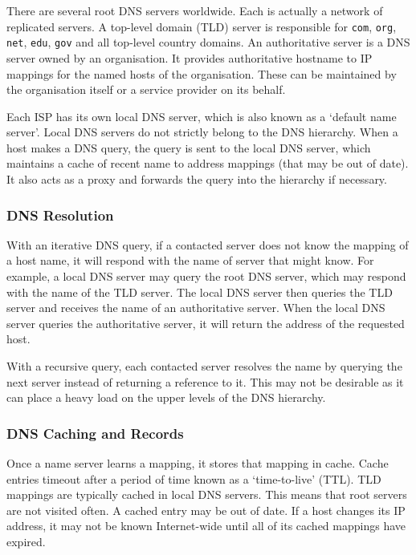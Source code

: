 There are several root DNS servers worldwide.
Each is actually a network of replicated servers.
A top-level domain (TLD) server is responsible for \texttt{com}, \texttt{org}, \texttt{net}, \texttt{edu}, \texttt{gov} and all top-level country domains.
An authoritative server is a DNS server owned by an organisation.
It provides authoritative hostname to IP mappings for the named hosts of the organisation.
These can be maintained by the organisation itself or a service provider on its behalf.

Each ISP has its own local DNS server, which is also known as a `default name server'.
Local DNS servers do not strictly belong to the DNS hierarchy.
When a host makes a DNS query, the query is sent to the local DNS server, which maintains a cache of recent name to address mappings (that may be out of date).
It also acts as a proxy and forwards the query into the hierarchy if necessary.

\subsubsection{DNS Resolution}

With an iterative DNS query, if a contacted server does not know the mapping of a host name, it will respond with the name of server that might know.
For example, a local DNS server may query the root DNS server, which may respond with the name of the TLD server.
The local DNS server then queries the TLD server and receives the name of an authoritative server.
When the local DNS server queries the authoritative server, it will return the address of the requested host.

With a recursive query, each contacted server resolves the name by querying the next server instead of returning a reference to it.
This may not be desirable as it can place a heavy load on the upper levels of the DNS hierarchy.

\subsubsection{DNS Caching and Records}

Once a name server learns a mapping, it stores that mapping in cache.
Cache entries timeout after a period of time known as a `time-to-live' (TTL).
TLD mappings are typically cached in local DNS servers.
This means that root servers are not visited often.
A cached entry may be out of date.
If a host changes its IP address, it may not be known Internet-wide until all of its cached mappings have expired.

